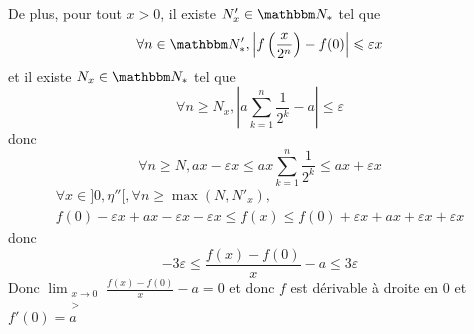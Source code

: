 De plus, pour tout $x >0$, il existe $N'_x \in \N_*$ tel que \[
	\forall n \in \N_*', \left| f\left( \frac{x}{2^n} \right) - f(0) \right| \le \varepsilon x
\] et il existe $N_x \in \N_*$ tel que \[
	\forall n \ge N_x, \left| a\sum_{k=1}^n \frac{1}{2^k} - a \right| \le \varepsilon
\] donc \[
	\forall n \ge N, ax - \varepsilon x \le ax \sum_{k=1}^n \frac{1}{2^k} \le ax + \varepsilon x
\]
\begin{align*}
	\forall x \in ]0,\eta''[, \forall n \ge \max(N, N'_x), \\
	f(0) - \varepsilon x + ax - \varepsilon x - \varepsilon x \le f(x) \le f(0) + \varepsilon x + ax + \varepsilon x + \varepsilon x
\end{align*}
donc \[
	-3\varepsilon \le \frac{f(x) - f(0)}{x} - a \le 3\varepsilon
\]
Donc $\lim_{\substack{x\to 0 \\ >}} \frac{f(x) - f(0)}{x}-a = 0$
et donc $f$ est dérivable à droite en 0 et $f'(0) = a$
